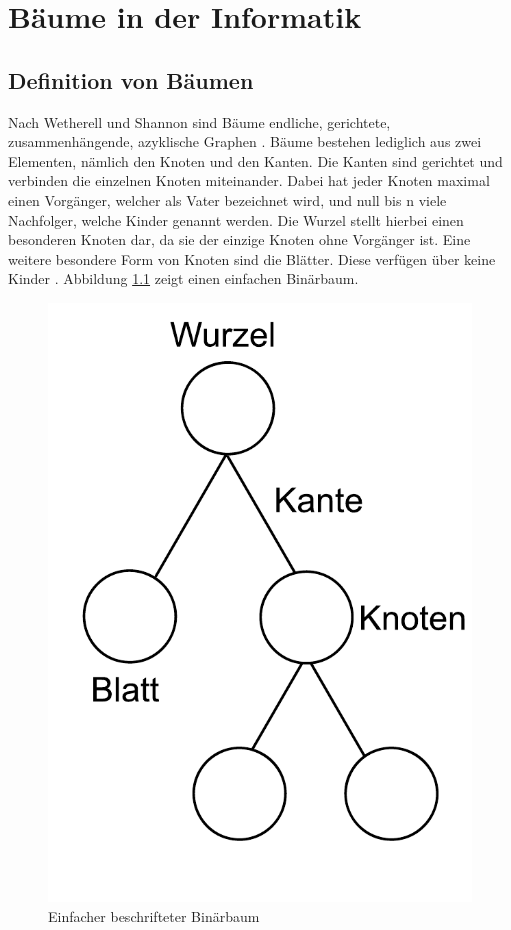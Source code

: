 \chapter{Bäume in der Informatik}
\label{chap:kapitel2}

\section{Definition von Bäumen}

Nach Wetherell und Shannon sind Bäume endliche, gerichtete, zusammenhängende, azyklische Graphen \cite[]{q1}. 
Bäume bestehen lediglich aus zwei Elementen, nämlich den Knoten und den Kanten. Die Kanten sind gerichtet und verbinden die einzelnen 
Knoten miteinander. Dabei hat jeder Knoten maximal einen Vorgänger, welcher als Vater bezeichnet wird, und null 
bis n viele Nachfolger, welche Kinder genannt werden. Die Wurzel stellt hierbei einen besonderen Knoten dar, da sie der 
einzige Knoten ohne Vorgänger ist. Eine weitere besondere Form von Knoten sind die Blätter. Diese verfügen über 
keine Kinder \cite{q4}. Abbildung \ref{pic:simple_tree} zeigt einen einfachen Binärbaum.

\begin{figure}[H]
    \centering
    \includegraphics[scale = 0.5]{abbildungen/simple_tree}
    \caption{Einfacher beschrifteter Binärbaum}
    \label{pic:simple_tree} 
\end{figure}


